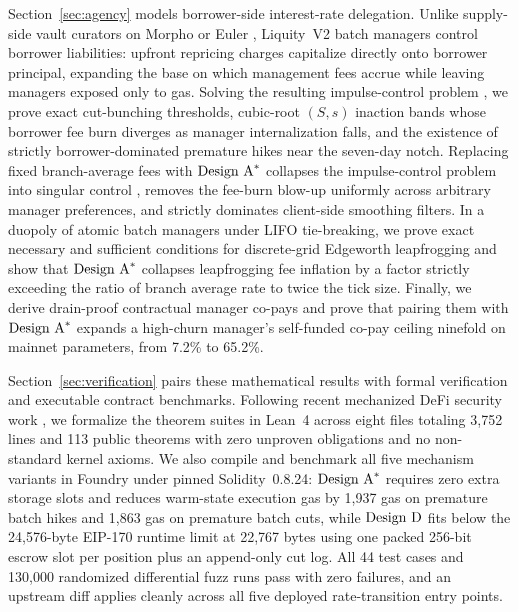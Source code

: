 Section~\ref{sec:agency} models borrower-side interest-rate delegation. Unlike supply-side vault curators on Morpho or Euler \citep{chitra2025curationary,zbandut2025institutionalizing,mancino2026sok}, Liquity~V2 batch managers control borrower liabilities: upfront repricing charges capitalize directly onto borrower principal, expanding the base on which management fees accrue while leaving managers exposed only to gas. Solving the resulting impulse-control problem \citep{harrison1983sellke}, we prove exact cut-bunching thresholds, cubic-root $(S,s)$ inaction bands whose borrower fee burn diverges as manager internalization falls, and the existence of strictly borrower-dominated premature hikes near the seven-day notch. Replacing fixed branch-average fees with $\textup{Design A}^*$ collapses the impulse-control problem into singular control \citep{harrison1983instantaneous}, removes the fee-burn blow-up uniformly across arbitrary manager preferences, and strictly dominates client-side smoothing filters. In a duopoly of atomic batch managers under LIFO tie-breaking, we prove exact necessary and sufficient conditions for discrete-grid Edgeworth leapfrogging \citep{maskin1988theory} and show that $\textup{Design A}^*$ collapses leapfrogging fee inflation by a factor strictly exceeding the ratio of branch average rate to twice the tick size. Finally, we derive drain-proof contractual manager co-pays and prove that pairing them with $\textup{Design A}^*$ expands a high-churn manager's self-funded co-pay ceiling ninefold on mainnet parameters, from 7.2\% to 65.2\%.

Section~\ref{sec:verification} pairs these mathematical results with formal verification and executable contract benchmarks. Following recent mechanized DeFi security work \citep{bartoletti2025lean,bartoletti2026comp}, we formalize the theorem suites in Lean~4 across eight files totaling 3,752 lines and 113 public theorems with zero unproven obligations and no non-standard kernel axioms. We also compile and benchmark all five mechanism variants in Foundry under pinned Solidity~0.8.24: $\textup{Design A}^*$ requires zero extra storage slots and reduces warm-state execution gas by 1,937 gas on premature batch hikes and 1,863 gas on premature batch cuts, while $\textup{Design D}$ fits below the 24,576-byte EIP-170 runtime limit at 22,767 bytes using one packed 256-bit escrow slot per position plus an append-only cut log. All 44 test cases and 130,000 randomized differential fuzz runs pass with zero failures, and an upstream diff applies cleanly across all five deployed rate-transition entry points.

